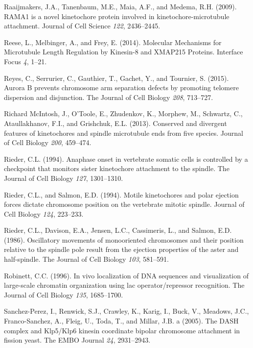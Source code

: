 \documentclass[12pt,a4paper,twoside,openright]{book}
\begin{document}
\hypertarget{ref-Raaijmakers2009}{}
Raaijmakers, J.A., Tanenbaum, M.E., Maia, A.F., and Medema, R.H. (2009).
RAMA1 is a novel kinetochore protein involved in kinetochore-microtubule
attachment. Journal of Cell Science \emph{122}, 2436--2445.

\hypertarget{ref-Reese2014a}{}
Reese, L., Melbinger, A., and Frey, E. (2014). Molecular Mechanisms for
Microtubule Length Regulation by Kinesin-8 and XMAP215 Proteins.
Interface Focus \emph{4}, 1--21.

\hypertarget{ref-Reyes2015}{}
Reyes, C., Serrurier, C., Gauthier, T., Gachet, Y., and Tournier, S.
(2015). Aurora B prevents chromosome arm separation defects by promoting
telomere dispersion and disjunction. The Journal of Cell Biology
\emph{208}, 713--727.

\hypertarget{ref-Mcintosh2013}{}
Richard McIntosh, J., O'Toole, E., Zhudenkov, K., Morphew, M., Schwartz,
C., Ataullakhanov, F.I., and Grishchuk, E.L. (2013). Conserved and
divergent features of kinetochores and spindle microtubule ends from
five species. Journal of Cell Biology \emph{200}, 459--474.

\hypertarget{ref-Rieder1994}{}
Rieder, C.L. (1994). Anaphase onset in vertebrate somatic cells is
controlled by a checkpoint that monitors sister kinetochore attachment
to the spindle. The Journal of Cell Biology \emph{127}, 1301--1310.

\hypertarget{ref-Rieder1994a}{}
Rieder, C.L., and Salmon, E.D. (1994). Motile kinetochores and polar
ejection forces dictate chromosome position on the vertebrate mitotic
spindle. Journal of Cell Biology \emph{124}, 223--233.

\hypertarget{ref-Rieder1986}{}
Rieder, C.L., Davison, E.A., Jensen, L.C., Cassimeris, L., and Salmon,
E.D. (1986). Oscillatory movements of monooriented chromosomes and their
position relative to the spindle pole result from the ejection
properties of the aster and half-spindle. The Journal of Cell Biology
\emph{103}, 581--591.

\hypertarget{ref-Robinett1996}{}
Robinett, C.C. (1996). In vivo localization of DNA sequences and
visualization of large-scale chromatin organization using lac
operator/repressor recognition. The Journal of Cell Biology \emph{135},
1685--1700.

\hypertarget{ref-Sanchez-Perez2005}{}
Sanchez-Perez, I., Renwick, S.J., Crawley, K., Karig, I., Buck, V.,
Meadows, J.C., Franco-Sanchez, A., Fleig, U., Toda, T., and Millar, J.B.
a (2005). The DASH complex and Klp5/Klp6 kinesin coordinate bipolar
chromosome attachment in fission yeast. The EMBO Journal \emph{24},
2931--2943.
\end{document}
